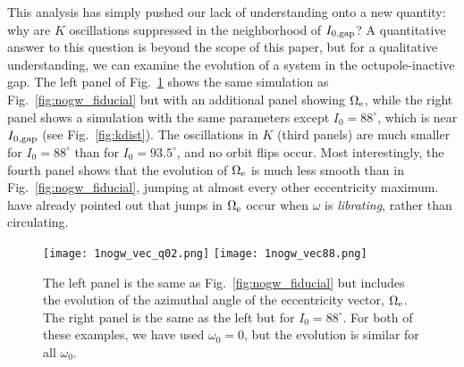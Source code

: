 \documentclass[
        fleqn,
        usenatbib,
    ]{mnras}
\begin{document}
This analysis has simply pushed our lack of understanding onto a new quantity:
why are $K$ oscillations suppressed in the neighborhood of $I_{\rm 0, gap}$? A
quantitative answer to this question is beyond the scope of this paper, but for
a qualitative understanding, we can examine the evolution of a system in the
octupole-inactive gap. The left panel of Fig.~\ref{fig:nogw_circ} shows the same
simulation as Fig.~\ref{fig:nogw_fiducial} but with an additional panel showing
$\Omega_{\rm e}$, while the right panel shows a simulation with the same
parameters except $I_0 = 88^\circ$, which is near $I_{\rm 0, gap}$ (see
Fig.~\ref{fig:kdist}). The oscillations in $K$ (third panels) are much smaller
for $I_0 = 88^\circ$ than for $I_0 = 93.5^\circ$, and no orbit flips occur. Most
interestingly, the fourth panel shows that the evolution of $\Omega_{\rm e}$ is
much less smooth than in Fig.~\ref{fig:nogw_fiducial}, jumping at almost every
other eccentricity maximum. \citet{katz2011long} have already pointed out that
jumps in $\Omega_{\rm e}$ occur when $\omega$ is \emph{librating}, rather than
circulating.

\begin{figure}
    \centering
    \texttt{[image: 1nogw\_vec\_q02.png]}
    \texttt{[image: 1nogw\_vec88.png]}
    \caption{The left panel is the same as Fig.~\ref{fig:nogw_fiducial} but
    includes the evolution of the azimuthal angle of the eccentricity vector,
    $\Omega_{\rm e}$. The right panel is the same as the left but for $I_0 =
    88^\circ$. For both of these examples, we have used $\omega_0 = 0$, but the
    evolution is similar for all $\omega_0$.}\label{fig:nogw_circ}
\end{figure}
\end{document}
